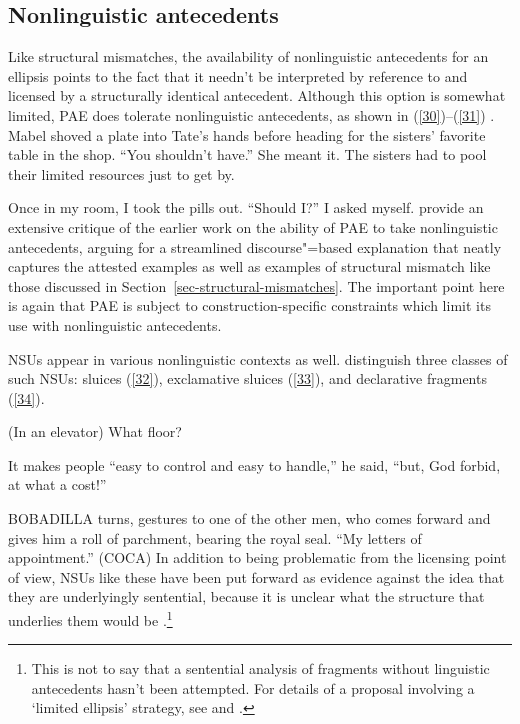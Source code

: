 {\subsection{Nonlinguistic antecedents}
\label{sec-nonlinguistic-antecedents}

Like structural mismatches, the availability of nonlinguistic antecedents for an ellipsis points to the fact that it needn't be interpreted by reference to and licensed by a structurally identical antecedent. Although this option is somewhat limited, PAE does tolerate nonlinguistic antecedents, as shown in (\ref{30})--(\ref{31}) \citep[see also][]{Hankamer1976, Schachter1977}.
\ea Mabel shoved a plate into Tate's hands before heading for the sisters' favorite table in the shop. ``You shouldn't have.'' She meant it. The sisters had to pool their limited resources
just to get by. \citep[ex. 23][]{Miller2014b}\label{30}\z

\ea Once in my room, I took the pills out. ``Should I?'' I asked myself. \citep[ex. 22a][]{Miller2014b}\label{31}\z
\citet{Miller2014b} provide an extensive critique of the earlier work on the ability of PAE to take nonlinguistic antecedents, arguing for a streamlined discourse"=based explanation that neatly captures the attested examples as well as examples of structural mismatch like those discussed in Section~\ref{sec-structural-mismatches}. The important point here is again that PAE is subject to construction-specific constraints which limit its use with nonlinguistic antecedents.

NSUs appear in various nonlinguistic contexts as well. \citet{Ginzburg2018} distinguish three classes of such NSUs: sluices (\ref{32}), exclamative sluices (\ref{33}), and declarative fragments (\ref{34}).

\ea (In an elevator) What floor? \citep[298]{Ginzburg:Sag:2000}\label{32}\z

\ea It makes people ``easy to control and easy to handle,'' he said, ``but, God forbid, at what a cost!''
\label{33}\z

\ea BOBADILLA turns, gestures to one of the other men, who comes forward and gives him a roll of parchment, bearing the royal seal. ``My letters of appointment.'' (COCA)\label{34}\z
In addition to being problematic from the licensing point of view, NSUs like these have been put forward as evidence against the idea that they are underlyingly sentential, because it is unclear what the structure that underlies them would be \citep[see][]{Ginzburg:Sag:2000, CJ2005a, Stainton2006}.\footnote{This is not to say that a sentential analysis of fragments without linguistic antecedents hasn't been attempted. For details of a proposal involving a `limited ellipsis' strategy, see \citet{Merchant2005a} and \citet{Merchant2010}.}


}
